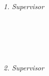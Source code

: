 \begin{titlepage}
	\centering

	\vfill
	\vspace*{3cm}
	{\LARGE \color{ctcolortitle}\textbf{\thesisTitle} \\[10mm]}
	{\Large \thesisName} \\

	\vfill
	\begin{minipage}[t]{.27\textwidth}
		\raggedleft
		\textit{1. Supervisor}
	\end{minipage}
	\hspace*{15pt}
	\begin{minipage}[t]{.65\textwidth}
		{\Large \thesisFirstReviewer} \\
		{\small \thesisFirstReviewerDepartment} \\[-1mm]
		{\small \thesisFirstReviewerUniversity}
	\end{minipage} \\[5mm]
	\begin{minipage}[t]{.27\textwidth}
		\raggedleft
		\textit{2. Supervisor}
	\end{minipage}
	\hspace*{15pt}
	\begin{minipage}[t]{.65\textwidth}
		{\Large \thesisSecondReviewer} \\
		{\small \thesisSecondReviewerDepartment} \\[-1mm]
		{\small \thesisSecondReviewerUniversity}
	\end{minipage} \\[20mm]

	\thesisDate \\

\end{titlepage}


